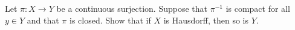 Let $\pi:X\rightarrow Y$ be a continuous surjection. Suppose that
$\pi^{-1}$ is compact for all $y\in Y$ and that $\pi$ is closed.
Show that if $X$ is Hausdorff, then so is $Y$.
